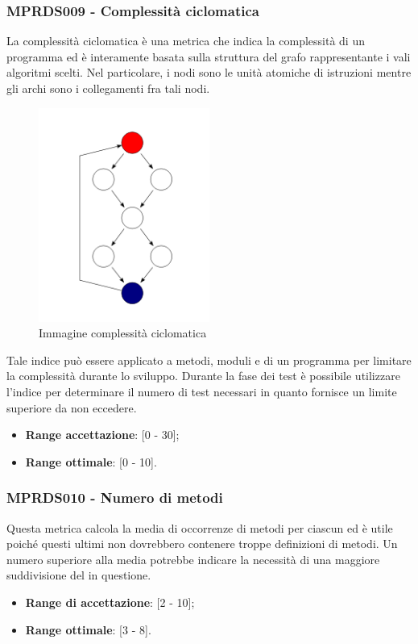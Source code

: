 {\subsubsection{MPRDS009 - Complessità ciclomatica}
La complessità ciclomatica è una metrica che indica la complessità di un programma ed è interamente basata sulla struttura del grafo rappresentante i vali algoritmi scelti. Nel particolare, i nodi sono le unità atomiche di istruzioni mentre gli archi sono i collegamenti fra tali nodi.
\begin{figure}[H]
    \begin{center}
    \includegraphics[width=0.5\textwidth]{../includes/pics/ciclomatica.png}
    \caption{Immagine complessità ciclomatica}
    \end{center}
\end{figure}
Tale indice può essere applicato a metodi, moduli e  di un programma per limitare la complessità durante lo sviluppo. Durante la fase dei test è possibile utilizzare l'indice per determinare il numero di test necessari in quanto fornisce un limite superiore da non eccedere.
\begin{itemize}
    \item \textbf{Range accettazione}: [0 - 30];
    \item \textbf{Range ottimale}: [0 - 10].
\end{itemize}
\subsubsection{MPRDS010 - Numero di metodi}
Questa metrica calcola la media di occorrenze di metodi per ciascun  ed è utile poiché questi ultimi non dovrebbero contenere troppe definizioni di metodi. Un numero superiore alla media potrebbe indicare la necessità di una maggiore suddivisione del  in questione.
\begin{itemize}
    \item \textbf{Range di accettazione}: [2 - 10];
    \item \textbf{Range ottimale}: [3 - 8].
\end{itemize}
}
